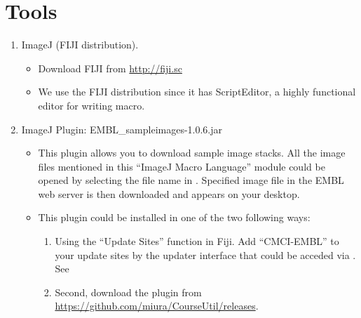 \section{Tools}
\label{sec:tools}

\begin{enumerate}
  \item ImageJ (FIJI distribution).

\begin{itemize}
    \item Download FIJI from \url{http://fiji.sc}
    \item We use the FIJI distribution since it has ScriptEditor, a highly functional editor for writing macro. 
  
\end{itemize}
  \item ImageJ Plugin: EMBL\_sampleimages-1.0.6.jar

\begin{itemize}
     \item This plugin allows you to download sample image stacks. All the image files mentioned in this ``ImageJ Macro Language'' module could be opened by selecting the file name in . Specified image file in the EMBL web server is then downloaded and appears on your desktop.
    \item This plugin could be installed in one of the two following ways:
    \begin{enumerate}
    \item Using the ``Update Sites'' function in Fiji. Add ``CMCI-EMBL'' to your update sites by the updater interface that could be acceded via . See         
    \item Second, download the plugin from \url{https://github.com/miura/CourseUtil/releases}. 
    \end{enumerate}
\end{itemize}

\end{enumerate}
 
\newpage